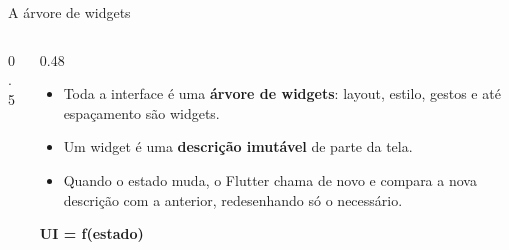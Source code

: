 \documentclass[aspectratio=169,10pt]{beamer}
\begin{document}
\begin{frame}{A árvore de widgets}
  \begin{columns}[c]
    \begin{column}{0.5\textwidth}
      \centering
    \end{column}
    \begin{column}{0.48\textwidth}
      \begin{itemize}
        \item Toda a interface é uma \textbf{árvore de widgets}: layout, estilo, gestos e até espaçamento são widgets.
        \item Um widget é uma \textbf{descrição imutável} de parte da tela.
        \item Quando o estado muda, o Flutter chama  de novo e compara a nova descrição com a anterior, redesenhando só o necessário.
      \end{itemize}
      \begin{destaque}
        \textbf{UI = f(estado)}
      \end{destaque}
    \end{column}
  \end{columns}
\end{frame}
\end{document}
